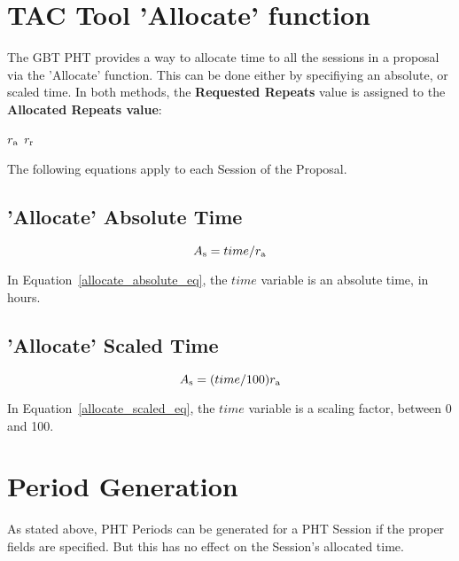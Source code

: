 \documentclass{article}
\begin{document}
\section{TAC Tool 'Allocate' function}

The GBT PHT provides a way to allocate time to all the sessions in a proposal via the 'Allocate' function.  This can be done either by specifiying an absolute, or scaled time.  In both methods, the  {\bf Requested Repeats} value is assigned to the {\bf Allocated Repeats value}:

\begin{algorithmic}
\STATE    $r_{\rm a}$  $r_{\rm r}$
\end{algorithmic}

The following equations apply to each Session of the Proposal.

\subsection{'Allocate' Absolute Time}

\begin{equation}
\label{allocate_absolute_eq}
    A_{\rm s} = time / r_{\rm a}
\end{equation}

In Equation~\ref{allocate_absolute_eq}, the $time$ variable is an absolute time, in hours.  

\subsection{'Allocate' Scaled Time}

\begin{equation}
\label{allocate_scaled_eq}
    A_{\rm s} = (time/100) r_{\rm a}
\end{equation}

In Equation~\ref{allocate_scaled_eq}, the $time$ variable is a scaling factor, between 0 and 100.  

\section{Period Generation}

   As stated above, PHT Periods can be generated for a PHT Session if the proper fields are specified.  But this has no effect on the Session's allocated time.
\end{document}
